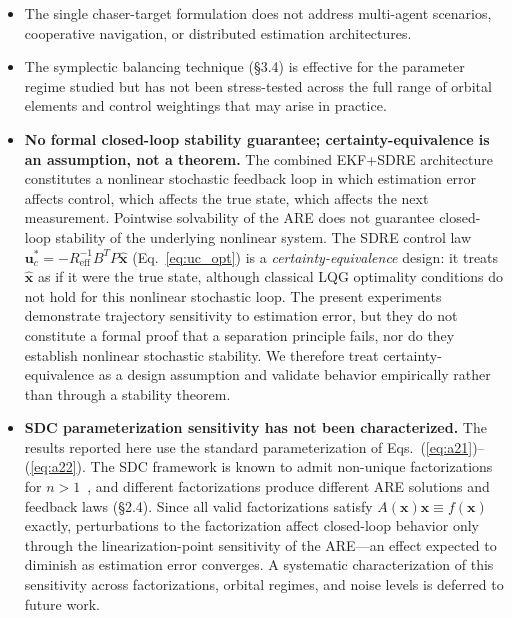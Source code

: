 \documentclass[preprint,3p,times]{elsarticle}
\begin{document}
\begin{itemize}
    \item The single chaser-target formulation does not address multi-agent scenarios, cooperative navigation, or distributed estimation architectures.

    \item The symplectic balancing technique (§3.4) is effective for the parameter regime studied but has not been stress-tested across the full range of orbital elements and control weightings that may arise in practice.

    \item \textbf{No formal closed-loop stability guarantee; certainty-equivalence is an assumption, not a theorem.} The combined EKF+SDRE architecture constitutes a nonlinear stochastic feedback loop in which estimation error affects control, which affects the true state, which affects the next measurement. Pointwise solvability of the ARE does not guarantee closed-loop stability of the underlying nonlinear system. The SDRE control law $\mathbf{u}_c^* = -R_{\text{eff}}^{-1} B^T P \hat{\mathbf{x}}$ (Eq.~\ref{eq:uc_opt}) is a \emph{certainty-equivalence} design: it treats $\hat{\mathbf{x}}$ as if it were the true state, although classical LQG optimality conditions do not hold for this nonlinear stochastic loop. The present experiments demonstrate trajectory sensitivity to estimation error, but they do not constitute a formal proof that a separation principle fails, nor do they establish nonlinear stochastic stability. We therefore treat certainty-equivalence as a design assumption and validate behavior empirically rather than through a stability theorem.

    \item \textbf{SDC parameterization sensitivity has not been characterized.} The results reported here use the standard parameterization of Eqs.~(\ref{eq:a21})--(\ref{eq:a22}). The SDC framework is known to admit non-unique factorizations for $n > 1$~\cite{Cimen2012}, and different factorizations produce different ARE solutions and feedback laws (§2.4). Since all valid factorizations satisfy $A(\mathbf{x})\mathbf{x} \equiv f(\mathbf{x})$ exactly, perturbations to the factorization affect closed-loop behavior only through the linearization-point sensitivity of the ARE---an effect expected to diminish as estimation error converges. A systematic characterization of this sensitivity across factorizations, orbital regimes, and noise levels is deferred to future work.


\end{itemize}
\end{document}
